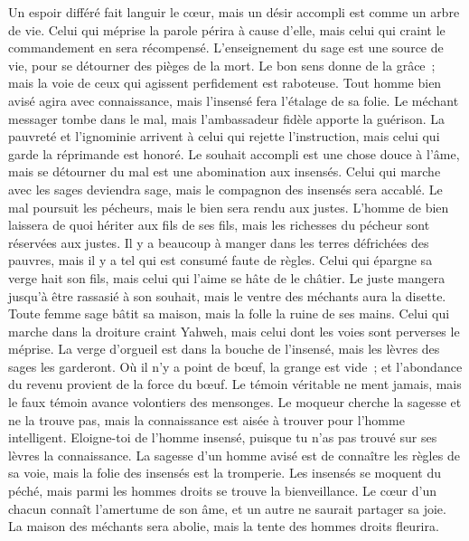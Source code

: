 \begin{multicols}{2}
Un espoir différé fait languir le cœur, mais un désir accompli est comme un arbre de vie.
Celui qui méprise la parole périra à cause d'elle, mais celui qui craint le commandement en sera récompensé.
L'enseignement du sage est une source de vie, pour se détourner des pièges de la mort.
Le bon sens donne de la grâce~; mais la voie de ceux qui agissent perfidement est raboteuse.
Tout homme bien avisé agira avec connaissance, mais l'insensé fera l'étalage de sa folie.
Le méchant messager tombe dans le mal, mais l'ambassadeur fidèle apporte la guérison.
La pauvreté et l'ignominie arrivent à celui qui rejette l'instruction, mais celui qui garde la réprimande est honoré.
Le souhait accompli est une chose douce à l'âme, mais se détourner du mal est une abomination aux insensés.
Celui qui marche avec les sages deviendra sage, mais le compagnon des insensés sera accablé.
Le mal poursuit les pécheurs, mais le bien sera rendu aux justes.
L'homme de bien laissera de quoi hériter aux fils de ses fils, mais les richesses du pécheur sont réservées aux justes.
Il y a beaucoup à manger dans les terres défrichées des pauvres, mais il y a tel qui est consumé faute de règles.
Celui qui épargne sa verge hait son fils, mais celui qui l'aime se hâte de le châtier.
Le juste mangera jusqu'à être rassasié à son souhait, mais le ventre des méchants aura la disette.
\VerseOne{}Toute femme sage bâtit sa maison, mais la folle la ruine de ses mains.
Celui qui marche dans la droiture craint Yahweh, mais celui dont les voies sont perverses le méprise.
La verge d'orgueil est dans la bouche de l'insensé, mais les lèvres des sages les garderont.
Où il n'y a point de bœuf, la grange est vide~; et l'abondance du revenu provient de la force du bœuf.
Le témoin véritable ne ment jamais, mais le faux témoin avance volontiers des mensonges.
Le moqueur cherche la sagesse et ne la trouve pas, mais la connaissance est aisée à trouver pour l'homme intelligent.
Eloigne-toi de l'homme insensé, puisque tu n'as pas trouvé sur ses lèvres la connaissance.
La sagesse d'un homme avisé est de connaître les règles de sa voie, mais la folie des insensés est la tromperie.
Les insensés se moquent du péché, mais parmi les hommes droits se trouve la bienveillance.
Le cœur d'un chacun connaît l'amertume de son âme, et un autre ne saurait partager sa joie.
La maison des méchants sera abolie, mais la tente des hommes droits fleurira.

\end{multicols}
